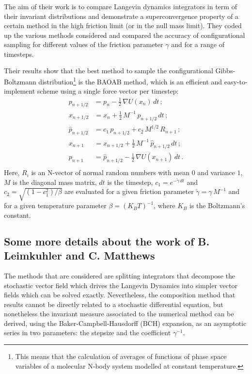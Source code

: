 \documentclass[10pt,a4paper]{book}
\theoremstyle{definition}
\begin{document}
The aim of their work is to compare Langevin dynamics integrators in term of their invariant distributions and demonstrate a superconvergence property of a certain method in the high friction limit (or in the null mass limit). They coded up the various methods considered and compared the accuracy of configurational sampling for different values of the friction parameter $\gamma$ and for a range of timesteps.

Their results show that the best method to sample the configurational Gibbs-Boltzmann distribution\footnote{This means that the calculation of averages of functions of phase space variables of a molecular N-body system modelled at constant temperature.} is the BAOAB method, which is an efficient and easy-to-implement scheme using a single force vector per timestep:
\begin{align*}
 p_{n+1/2} &= p_n-\frac{1}{2}\,\nabla U\left(x_n\right)\,dt\,; \\
 x_{n+1/2} &= x_n+\frac{1}{2}\,M^{-1}\,p_{n+1/2}\,dt\,; \\
 \widehat{p}_{n+1/2} &= c_1\,p_{n+1/2}+c_2\,M^{1/2}\,R_{n+1}\,; \\ 
 x_{n+1} &= x_{n+1/2}+\frac{1}{2}\,M^{-1}\,\widehat{p}_{n+1/2}\,dt\,; \\
 p_{n+1} &= \widehat{p}_{n+1/2}-\frac{1}{2}\,\nabla U\left(x_{n+1}\right)\,dt\,. \\
\end{align*}
Here, $R_i$ is an N-vector of normal random numbers with mean $0$ and variance $1$, $M$ is the diagonal mass matrix, $dt$ is the timestep, 
$c_1=e^{-\widetilde{\gamma}\,dt}$ and $c_2=\sqrt{\left(1-c_1^2\right)/\beta}$ are evaluated for a given friction parameter $\widetilde{\gamma}=\gamma\,M^{-1}$ and for a given temperature parameter $\beta=(K_BT)^{-1}$, where $K_B$ is the Boltzmann's constant.

\subsection{Some more details about the work of B. Leimkuhler and C. Matthews}
The methods that are considered are splitting integrators that decompose the stochastic vector field which drives the Langevin Dynamics into simpler vector fields which can be solved exactly. Nevertheless, the composition method that results cannot be directly related to a stochastic differential equation, but nonetheless the invariant measure associated to the numerical method can be derived, using the Baker-Campbell-Hausdorff (BCH) expansion, as an asymptotic series in two parameters: the stepsize and the coefficient $\gamma^{-1}$. 
\end{document}
